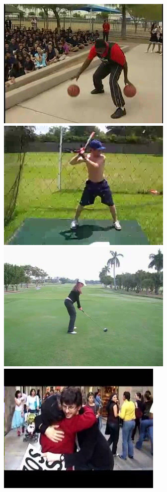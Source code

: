 \begin{figure}[!t]
\begin{center}
\includegraphics[scale=0.19]{cvpr14_figures/dataset_thumb/hmdb/class1.png}
\includegraphics[scale=0.19]{cvpr14_figures/dataset_thumb/hmdb/class2.png}
\includegraphics[scale=0.19]{cvpr14_figures/dataset_thumb/hmdb/class3.png} 
\includegraphics[scale=0.19]{cvpr14_figures/dataset_thumb/hmdb/class4.png} 

\end{center}
\end{figure}
